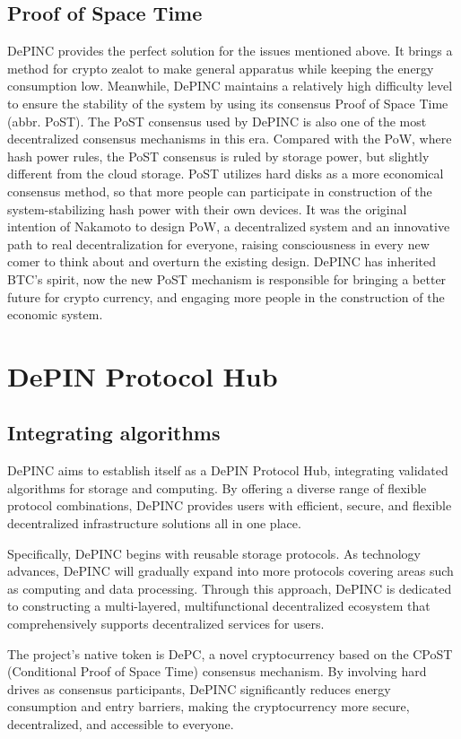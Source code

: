 \subsection{Proof of Space Time}
\begin{flushleft}
    DePINC provides the perfect solution for the issues mentioned above. It brings a method for crypto zealot to make general apparatus while keeping the energy consumption low. Meanwhile, DePINC maintains a relatively high difficulty level to ensure the stability of the system by using its consensus Proof of Space Time (abbr. PoST). The PoST consensus used by DePINC is also one of the most decentralized consensus mechanisms in this era. Compared with the PoW, where hash power rules, the PoST consensus is ruled by storage power, but slightly different from the cloud storage. PoST utilizes hard disks as a more economical consensus method, so that more people can participate in construction of the system-stabilizing hash power with their own devices. It was the original intention of Nakamoto to design PoW, a decentralized system and an innovative path to real decentralization for everyone, raising consciousness in every new comer to think about and overturn the existing design. DePINC has inherited BTC’s spirit, now the new PoST mechanism is responsible for bringing a better future for crypto currency, and engaging more people in the construction of the economic system.
\end{flushleft}
\section{DePIN Protocol Hub}
\subsection{Integrating algorithms}
\begin{flushleft}
    DePINC aims to establish itself as a DePIN Protocol Hub, integrating validated algorithms for storage and computing. By offering a diverse range of flexible protocol combinations, DePINC provides users with efficient, secure, and flexible decentralized infrastructure solutions all in one place.
\end{flushleft}
\begin{flushleft}
    Specifically, DePINC begins with reusable storage protocols. As technology advances, DePINC will gradually expand into more protocols covering areas such as computing and data processing. Through this approach, DePINC is dedicated to constructing a multi-layered, multifunctional decentralized ecosystem that comprehensively supports decentralized services for users.
\end{flushleft}
\begin{flushleft}
    The project's native token is DePC, a novel cryptocurrency based on the CPoST (Conditional Proof of Space Time) consensus mechanism. By involving hard drives as consensus participants, DePINC significantly reduces energy consumption and entry barriers, making the cryptocurrency more secure, decentralized, and accessible to everyone.
\end{flushleft}
